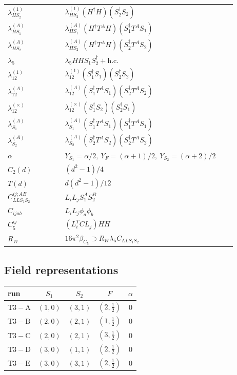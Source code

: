 \documentclass[9pt]{article}
\begin{document}
\begin{longtable}{@{}p{0.23\linewidth}p{0.69\linewidth}@{}}
$\lambda_{HS_2}^{(1)}$ & $\lambda_{HS_2}^{(1)}(H^\dagger H)(S_2^\dagger S_2)$ \\
$\lambda_{HS_1}^{(A)}$ & $\lambda_{HS_1}^{(A)}(H^\dagger T^AH)(S_1^\dagger T^AS_1)$ \\
$\lambda_{HS_2}^{(A)}$ & $\lambda_{HS_2}^{(A)}(H^\dagger T^AH)(S_2^\dagger T^AS_2)$ \\
$\lambda_5$ & $\lambda_5HHS_1S_2^\dagger+\mathrm{h.c.}$ \\
$\lambda_{12}^{(1)}$ & $\lambda_{12}^{(1)}(S_1^\dagger S_1)(S_2^\dagger S_2)$ \\
$\lambda_{12}^{(A)}$ & $\lambda_{12}^{(A)}(S_1^\dagger T^AS_1)(S_2^\dagger T^AS_2)$ \\
$\lambda_{12}^{(\times)}$ & $\lambda_{12}^{(\times)}(S_1^\dagger S_2)(S_2^\dagger S_1)$ \\
$\lambda_{S_1}^{(A)}$ & $\lambda_{S_1}^{(A)}(S_1^\dagger T^A S_1)(S_1^\dagger T^A S_1)$ \\
$\lambda_{S_2}^{(A)}$ & $\lambda_{S_2}^{(A)}(S_2^\dagger T^A S_2)(S_2^\dagger T^A S_2)$ \\
$\alpha$ & $Y_{S_1}=\alpha/2,\ Y_F=(\alpha+1)/2,\ Y_{S_2}=(\alpha+2)/2$ \\
$C_2(d)$ & $(d^2-1)/4$ \\
$T(d)$ & $d(d^2-1)/12$ \\
$C_{LLS_1S_2}^{ij;AB}$ & $L_iL_jS_1^AS_2^B$ \\
$C_{ijab}$ & $L_iL_j\phi_a\phi_b$ \\
$C_5^{ij}$ & $(L_i^TCL_j)HH$ \\
$R_W$ & $16\pi^2\beta_{C_5}\supset R_W\lambda_5C_{LLS_1S_2}$ \\
\bottomrule
\end{longtable}
\subsection*{Field representations}
\begin{longtable}{@{}lcccc@{}}
\toprule
run & $S_1$ & $S_2$ & $F$ & $\alpha$ \\
\midrule
$\mathrm{T3-A}$ & $(1,0)$ & $(3,1)$ & $(2,\frac{1}{2})$ & $0$ \\
$\mathrm{T3-B}$ & $(2,0)$ & $(2,1)$ & $(1,\frac{1}{2})$ & $0$ \\
$\mathrm{T3-C}$ & $(2,0)$ & $(2,1)$ & $(3,\frac{1}{2})$ & $0$ \\
$\mathrm{T3-D}$ & $(3,0)$ & $(1,1)$ & $(2,\frac{1}{2})$ & $0$ \\
$\mathrm{T3-E}$ & $(3,0)$ & $(3,1)$ & $(2,\frac{1}{2})$ & $0$ \\
\bottomrule
\end{longtable}
\end{document}
